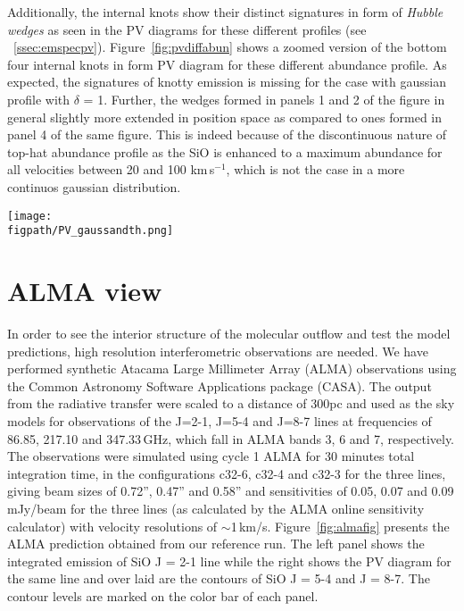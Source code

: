 \documentclass[useAMS,usenatbib]{mn2e}
\newcommand{\figpath}{/Users/bhargavvaidya/MyProject/work/Leeds_Uni/SiOJets_New/PAPER/PFIGS/}
\begin{document}
Additionally, the internal knots show their distinct signatures in
form of {\em Hubble wedges} as seen in the PV diagrams for these
different profiles (see
~\ref{ssec:emspecpv}). Figure~\ref{fig:pvdiffabun} shows a zoomed
version of the bottom four internal knots in form PV diagram for these
different abundance profile. As expected, the signatures of knotty
emission is missing for the case with gaussian profile with $\delta$ =
1. Further, the wedges formed in panels 1 and 2 of the figure in
general slightly more extended in position space as compared to ones
formed in panel 4 of the same figure. This is indeed because of the
discontinuous nature of top-hat abundance profile as the SiO is
enhanced to a maximum abundance for all velocities between 20 and 100
km\,s$^{-1}$, which is not the case in a more continuos gaussian
distribution.

\begin{figure*}
 \texttt{[image: \\figpath/PV\_gaussandth.png]}
 \caption{Contour maps of position-velocity diagram for the internal
   knots for 2-$>$1 SiO emission for runs with molecular
   cooling having $\eta$ = 3 and $\beta$ = 10 and different abundance
   profiles. The contours mark different levels of emission in Kelvins, viz.,
   0.2,0.6,1.0,1.4,1.8,2.0,3.0,4.0.}
\label{fig:pvdiffabun}
\end{figure*}
   
 
\section{ALMA view}
\label{sec:ALMAview}
%
In order to see the interior structure of the molecular outflow and
test the model predictions, high
resolution interferometric observations are needed. 
We have performed synthetic Atacama Large Millimeter
Array (ALMA) observations using the Common Astronomy Software
Applications package (CASA). The output from the radiative transfer
were scaled to a distance of 300pc and used as the sky models for observations of
the J=2-1, J=5-4 and J=8-7 lines at frequencies of 86.85, 217.10 and
347.33$\,$GHz, which fall in ALMA bands 3, 6 and 7, respectively. The observations
were simulated using cycle 1 ALMA for 30 minutes total integration
time, in the configurations c32-6, c32-4 and c32-3 for the three
lines, giving beam sizes of 0.72'', 0.47'' and 0.58'' and
sensitivities of 0.05, 0.07 and 0.09$\,$mJy/beam for the three lines
(as calculated by the ALMA online sensitivity calculator) with
velocity resolutions of $\sim$1$\,$km/s.
 Figure~\ref{fig:almafig}
presents the ALMA prediction obtained from our reference run. The
left panel shows the integrated emission of SiO J = 2-1 line while the right
shows the PV diagram for the same line and over laid are
the contours of SiO J = 5-4 and J = 8-7. The contour levels are marked
on the color bar of each panel. 
\end{document}

